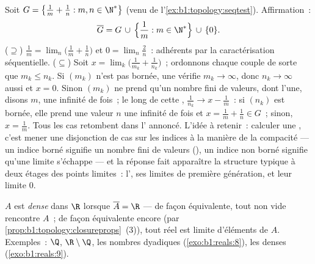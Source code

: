 \begin{example}\label{ex:b1:topology:closurecomputed}
Soit $G = \bigl\{\frac1m + \frac1n : m, n \in \N^*\bigr\}$ (venu de
l'\cref{ex:b1:topology:seqtest}). Affirmation~:
\[
\overline G = G \,\cup\, \Bigl\{\frac1m : m \in \N^*\Bigr\}
\,\cup\, \{0\} .
\]
($\supseteq$) $\frac1m = \lim_n \bigl(\frac1m + \frac1n\bigr)$
et $0 = \lim_n \frac2n$~: adhérents par la caractérisation
séquentielle. ($\subseteq$) Soit $x = \lim_k \bigl(
\frac{1}{m_k} + \frac{1}{n_k}\bigr)$~; ordonnons chaque couple de
sorte que $m_k \leq n_k$. Si $(m_k)$ n'est pas bornée, une  vérifie $m_k \to \infty$, donc $n_k \to \infty$ aussi et
$x = 0$. Sinon $(m_k)$ ne prend qu'un nombre fini de valeurs,
dont l'une, disons $m$, une infinité de fois~; le long de cette
, $\frac{1}{n_k} \to x - \frac1m$~: si $(n_k)$ est
bornée, elle prend une valeur $n$ une infinité de fois et $x =
\frac1m + \frac1n \in G$~; sinon, $x = \frac1m$. Tous les cas
retombent dans l' annoncé. L'idée à retenir~: calculer
une , c'est mener une disjonction de cas sur les indices
à la manière de la compacité --- un indice borné signifie un
nombre fini de valeurs (), un indice non
borné signifie qu'une limite s'échappe --- et la réponse fait
apparaître la structure typique à deux étages des points
limites~: l', ses limites de première génération, et leur
limite $0$.
\end{example}

\begin{definition}\label{def:b1:topology:dense}
$A$ est \emph{dense} dans $\R$ lorsque $\overline A = \R$
--- de façon équivalente, tout   non vide rencontre
$A$~; de façon équivalente encore (par
\cref{prop:b1:topology:closureprops}~(3)), tout réel est limite
d'éléments de $A$. Exemples~: $\Q$, $\R \setminus \Q$, les nombres
dyadiques (\cref{exo:b1:reals:8}), les  denses
(\cref{exo:b1:reals:9}).
\end{definition}

